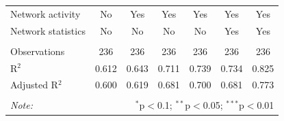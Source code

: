 \begin{table}[!htbp]
\begin{tabular}{@{\extracolsep{5pt}}lcccccc}
Network activity & No & Yes & Yes & Yes & Yes & Yes \\ 
Network statistics & No & No & No & No & Yes & Yes \\ 
\hline &  &  &  &  &  &  \\ 
Observations & 236 & 236 & 236 & 236 & 236 & 236 \\ 
R$^{2}$ & 0.612 & 0.643 & 0.711 & 0.739 & 0.734 & 0.825 \\ 
Adjusted R$^{2}$ & 0.600 & 0.619 & 0.681 & 0.700 & 0.681 & 0.773 \\ 
\hline 
\hline \\[-1.8ex] 
\textit{Note:}  & \multicolumn{6}{r}{$^{*}$p$<$0.1; $^{**}$p$<$0.05; $^{***}$p$<$0.01} \\ 
\end{tabular} 
\end{table} 
